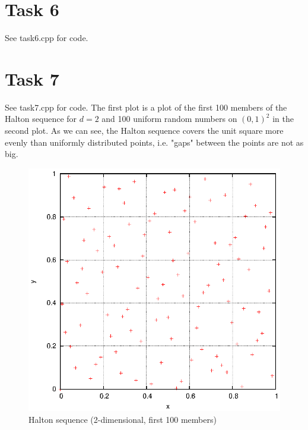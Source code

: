 \documentclass[]{article}
\begin{document}
\section*{Task 6}
See task6.cpp for code.

\section*{Task 7} See task7.cpp for code. The first plot is a plot of the
first 100 members of the Halton sequence for $d=2$ and 100 uniform random numbers on
$(0,1)^2$ in the second plot. As we can see, the Halton sequence covers the
unit square more evenly than uniformly distributed points, i.e. "gaps" between the points are not as
big.\\
\begin{figure}[!ht]
\includegraphics[width=.9\textwidth]{task7_halton.eps}
\caption{Halton sequence (2-dimensional, first 100 members)}
\label{fig:Task7a}
\end{figure}
\end{document}
